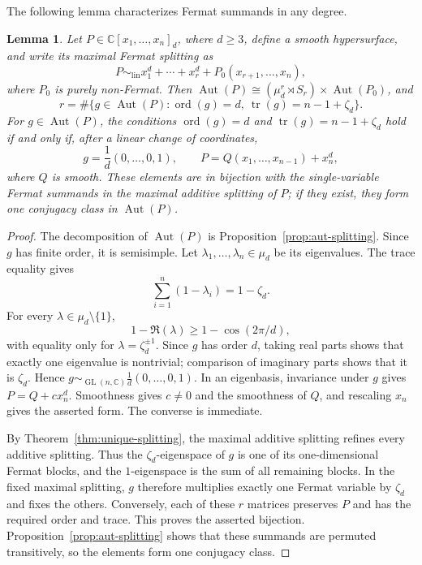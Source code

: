 \documentclass[12pt]{amsart}
\numberwithin{equation}{section}
\theoremstyle{plain}
\newtheorem{lem}[thm]{Lemma}
\theoremstyle{definition}
\theoremstyle{remark}
\newcommand{\CC}{\mathbb C}
\DeclareMathOperator{\Aut}{Aut}
\DeclareMathOperator{\GL}{GL}
\DeclareMathOperator{\tr}{tr}
\DeclareMathOperator{\ord}{ord}
\begin{document}
The following lemma characterizes Fermat summands in any degree.

\begin{lem}\label{lem:threefold-fermat-element}
Let \(P\in\CC[x_1,\ldots,x_n]_d\), where \(d\geq3\), define a smooth
hypersurface, and write its maximal Fermat splitting as
\[
 P\sim_{\mathrm{lin}}x_1^d+\cdots+x_r^d
 +P_0(x_{r+1},\ldots,x_n),
\]
where \(P_0\) is purely non-Fermat.  Then
\(\Aut(P)\cong(\mu_d^r\rtimes S_r)\times\Aut(P_0)\), and
\[
 r=\#\{g\in\Aut(P):\ord(g)=d,\ \tr(g)=n-1+\zeta_d\}.
\]
For \(g\in\Aut(P)\), the conditions \(\ord(g)=d\) and
\(\tr(g)=n-1+\zeta_d\) hold if and only if, after a linear change of
coordinates,
\[
 g=\frac1d(0,\ldots,0,1),\qquad
 P=Q(x_1,\ldots,x_{n-1})+x_n^d,
\]
where \(Q\) is smooth.  These elements are in bijection with the
single-variable Fermat summands in the maximal additive splitting of \(P\); if
they exist, they form one conjugacy class in \(\Aut(P)\).
\end{lem}

\begin{proof}
The decomposition of \(\Aut(P)\) is Proposition~\ref{prop:aut-splitting}.
Since \(g\) has finite order, it is semisimple.  Let
\(\lambda_1,\ldots,\lambda_n\in\mu_d\) be its eigenvalues.
The trace equality gives
\[
 \sum_{i=1}^n(1-\lambda_i)=1-\zeta_d.
\]
For every \(\lambda\in\mu_d\setminus\{1\}\),
\[
 1-\Re(\lambda)\geq1-\cos(2\pi/d),
\]
with equality only for \(\lambda=\zeta_d^{\pm1}\).  Since \(g\) has order
\(d\), taking real parts shows that exactly one eigenvalue is nontrivial;
comparison of imaginary parts shows that it is \(\zeta_d\).  Hence
\(g\sim_{\GL(n,\CC)}\frac1d(0,\ldots,0,1)\).  In an eigenbasis, invariance
under \(g\) gives \(P=Q+c x_n^d\).  Smoothness gives \(c\ne0\) and the
smoothness of \(Q\), and rescaling \(x_n\) gives the asserted form.  The
converse is immediate.

By Theorem~\ref{thm:unique-splitting}, the maximal additive splitting
refines every additive splitting. Thus the \(\zeta_d\)-eigenspace of
\(g\) is one of its one-dimensional Fermat blocks, and the
\(1\)-eigenspace is the sum of all remaining blocks. In the fixed maximal
splitting, \(g\) therefore multiplies exactly one Fermat variable by
\(\zeta_d\) and fixes the others. Conversely, each of these \(r\)
matrices preserves \(P\) and has the required order and trace.
This proves the asserted bijection. Proposition~\ref{prop:aut-splitting}
shows that these summands are permuted transitively, so the elements form
one conjugacy class.
\end{proof}
\end{document}
